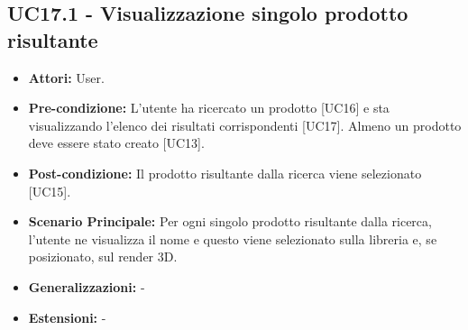 \subsection{UC17.1 - Visualizzazione singolo prodotto risultante}
\begin{itemize}
    \item \textbf{Attori:} User.
    \item \textbf{Pre-condizione:} L'utente ha ricercato un prodotto [UC16] e sta visualizzando l'elenco dei risultati corrispondenti [UC17]. Almeno un prodotto deve essere stato creato [UC13].
    \item \textbf{Post-condizione:} Il prodotto risultante dalla ricerca viene selezionato [UC15].
    \item \textbf{Scenario Principale:} Per ogni singolo prodotto risultante dalla ricerca, l'utente ne visualizza il nome e questo viene selezionato sulla libreria e, se posizionato, sul render 3D.
    \item \textbf{Generalizzazioni:} -
    \item \textbf{Estensioni:} -
\end{itemize}